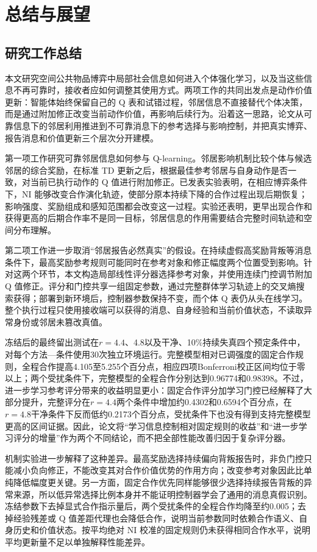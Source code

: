 \chapter{总结与展望}
\label{chap:conclusion}

\section{研究工作总结}

本文研究空间公共物品博弈中局部社会信息如何进入个体强化学习，以及当这些信息不再可靠时，接收者应如何调整其使用方式。两项工作的共同出发点是动作价值更新：智能体始终保留自己的 Q 表和试错过程，邻居信息不直接替代个体决策，而是通过附加修正改变当前动作价值，再影响后续行为。沿着这一思路，论文从可靠信息下的邻居利用推进到不可靠消息下的参考选择与影响控制，并把真实博弈、报告消息和价值更新三个层次分开建模。

第一项工作研究可靠邻居信息如何参与 Q-learning。邻居影响机制比较个体与候选邻居的综合奖励，在标准 TD 更新之后，根据最佳参考邻居与自身动作是否一致，对当前已执行动作的 Q 值进行附加修正。已发表实验表明，在相应博弈条件下，NI 能够改变合作演化轨迹，使部分原本持续下降的合作过程出现后期恢复；影响强度、奖励组成和感知范围都会改变这一过程。实验还表明，更早出现合作和获得更高的后期合作率不是同一目标，邻居信息的作用需要结合完整时间轨迹和空间分布理解。

第二项工作进一步取消“邻居报告必然真实”的假设。在持续虚假高奖励背叛等消息条件下，最高奖励参考规则可能同时在参考对象和修正幅度两个位置受到影响。针对这两个环节，本文构造局部线性评分器选择参考对象，并使用连续门控调节附加 Q 值修正。评分和门控共享一组固定参数，通过完整群体学习轨迹上的交叉熵搜索获得；部署到新环境后，控制器参数保持不变，而个体 Q 表仍从头在线学习。整个执行过程只使用接收端可以获得的消息、自身经验和当前价值状态，不读取异常身份或邻居未篡改真值。

冻结后的最终留出测试在$r=4.4$、4.8以及干净、10\%持续失真四个预定条件中，对每个方法—条件使用30次独立环境运行。完整模型相对已调强度的固定合作规则，全程合作提高4.105至5.255个百分点，相应四项Bonferroni校正区间均位于零以上；两个受扰条件下，完整模型的全程合作分别达到0.96774和0.98398。不过，进一步学习参考评分带来的收益明显更小：固定合作评分加学习门控已经解释了大部分提升，完整评分在$r=4.4$两个条件中增加约0.4302和0.6594个百分点，在$r=4.8$干净条件下反而低约0.2173个百分点，受扰条件下也没有得到支持完整模型更高的区间证据。因此，论文将“学习信息控制相对固定规则的收益”和“进一步学习评分的增量”作为两个不同结论，而不把全部性能改善归因于复杂评分器。

机制实验进一步解释了这种差异。最高奖励选择持续偏向背叛报告时，非负门控只能减小负向修正，不能改变其对合作价值优势的作用方向；改变参考对象因此比单纯降低幅度更关键。另一方面，固定合作优先同样能够很少选择持续报告背叛的异常来源，所以低异常选择比例本身并不能证明控制器学会了通用的消息真假识别。冻结参数下去掉显式合作指示量后，两个受扰条件的全程合作均降至约0.005；去掉经验残差或 Q 值差距代理也会降低合作，说明当前参数同时依赖合作语义、自身历史和价值状态。按平均绝对 NI 校准的固定规则仍未获得相同合作水平，说明平均更新量不足以单独解释性能差异。

